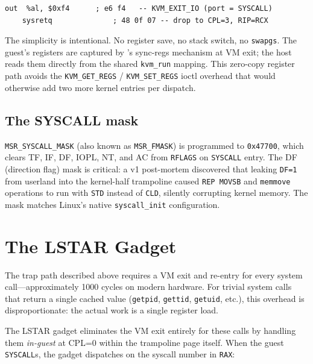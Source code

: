 \begin{lstlisting}[language={[x86masm]Assembler},
    caption={LSTAR trampoline bytes (fallback path)},
    label={lst:lstar-fallback}]
    out  %al, $0xf4      ; e6 f4   -- KVM_EXIT_IO (port = SYSCALL)
    sysretq              ; 48 0f 07 -- drop to CPL=3, RIP=RCX
\end{lstlisting}

The simplicity is intentional.  No register save, no stack switch, no
\texttt{swapgs}.  The guest's registers are captured by \KVM{}'s sync-regs
mechanism at VM exit; the host reads them directly from the shared
\texttt{kvm\_run} mapping.  This zero-copy register path avoids the
\texttt{KVM\_GET\_REGS} / \texttt{KVM\_SET\_REGS} ioctl overhead that
would otherwise add two more kernel entries per dispatch.


\subsection{The SYSCALL mask}

\texttt{MSR\_SYSCALL\_MASK} (also known as \texttt{MSR\_FMASK}) is programmed
to \texttt{0x47700}, which clears TF, IF, DF, IOPL, NT, and AC from
\texttt{RFLAGS} on \texttt{SYSCALL} entry.  The DF (direction flag) mask
is critical: a v1 post-mortem discovered that leaking \texttt{DF=1} from
userland into the kernel-half trampoline caused \texttt{REP MOVSB} and
\texttt{memmove} operations to run with \texttt{STD} instead of \texttt{CLD},
silently corrupting kernel memory.  The mask matches Linux's native
\texttt{syscall\_init} configuration.


\section{The LSTAR Gadget}
\label{sec:kvm-gadget}

The trap path described above requires a VM exit and re-entry for every
system call---approximately \num{1000} cycles on modern hardware.  For
trivial system calls that return a single cached value
(\texttt{getpid}, \texttt{gettid}, \texttt{getuid}, etc.), this overhead is
disproportionate: the actual work is a single register load.

The LSTAR gadget eliminates the VM exit entirely for these calls by
handling them \emph{in-guest} at CPL=0 within the trampoline page itself.
When the guest \texttt{SYSCALL}s, the gadget dispatches on the syscall
number in \texttt{RAX}:

